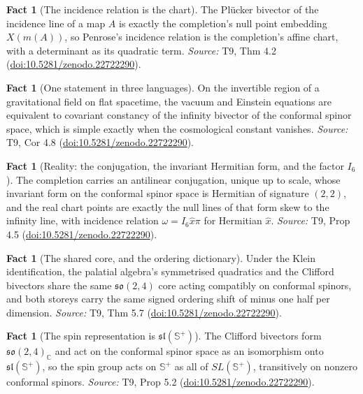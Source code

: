 \documentclass[11pt]{article}
\theoremstyle{definition}
\newtheorem{fact}[theorem]{Fact}
\theoremstyle{plain}
\providecommand{\C}{}\renewcommand{\C}{\mathbb{C}}
\providecommand{\CS}{}\renewcommand{\CS}{{\mathbb{S}^{+}}}
\begin{document}
\begin{fact}[The incidence relation is the chart]\label{c:correspondence.incidence-relation-chart}
The Pl\"ucker bivector of the incidence line of a map $A$ is exactly the completion's null point embedding $X(m(A))$, so Penrose's incidence relation is the completion's affine chart, with a determinant as its quadratic term.
\emph{Source:} T9, Thm 4.2 (\href{https://doi.org/10.5281/zenodo.22722290}{doi:10.5281/zenodo.22722290}).
\end{fact}

\begin{fact}[One statement in three languages]\label{c:correspondence.one-statement-three-languages}
On the invertible region of a gravitational field on flat spacetime, the vacuum and Einstein equations are equivalent to covariant constancy of the infinity bivector of the conformal spinor space, which is simple exactly when the cosmological constant vanishes.
\emph{Source:} T9, Cor 4.8 (\href{https://doi.org/10.5281/zenodo.22722290}{doi:10.5281/zenodo.22722290}).
\end{fact}

\begin{fact}[Reality: the conjugation, the invariant Hermitian form, and the factor $I_6$]\label{c:correspondence.reality-conjugation-twistor-form-factor}
The completion carries an antilinear conjugation, unique up to scale, whose invariant form on the conformal spinor space is Hermitian of signature $(2,2)$, and the real chart points are exactly the null lines of that form skew to the infinity line, with incidence relation $\omega = I_6\hat x\pi$ for Hermitian $\hat x$.
\emph{Source:} T9, Prop 4.5 (\href{https://doi.org/10.5281/zenodo.22722290}{doi:10.5281/zenodo.22722290}).
\end{fact}

\begin{fact}[The shared core, and the ordering dictionary]\label{c:correspondence.shared-core-ordering-dictionary}
Under the Klein identification, the palatial algebra's symmetrised quadratics and the Clifford bivectors share the same $\mathfrak{so}(2,4)$ core acting compatibly on conformal spinors, and both storeys carry the same signed ordering shift of minus one half per dimension.
\emph{Source:} T9, Thm 5.7 (\href{https://doi.org/10.5281/zenodo.22722290}{doi:10.5281/zenodo.22722290}).
\end{fact}

\begin{fact}[The spin representation is $\mathfrak{sl}(\CS)$]\label{c:correspondence.spin-representation}
The Clifford bivectors form $\mathfrak{so}(2,4)_\C$ and act on the conformal spinor space as an isomorphism onto $\mathfrak{sl}(\CS)$, so the spin group acts on $\CS$ as all of $SL(\CS)$, transitively on nonzero conformal spinors.
\emph{Source:} T9, Prop 5.2 (\href{https://doi.org/10.5281/zenodo.22722290}{doi:10.5281/zenodo.22722290}).
\end{fact}
\end{document}
